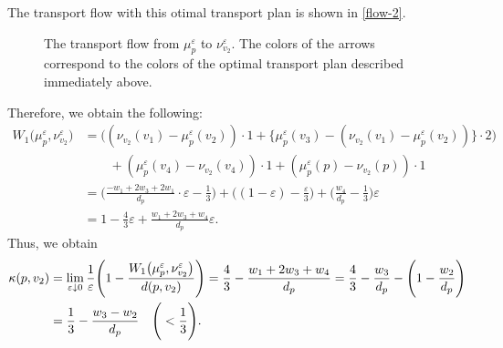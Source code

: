 \documentclass{article}
\numberwithin{equation}{section}
\theoremstyle{definition}
\newcommand{\K}{\kappa}
\newcommand{\eps}{\varepsilon} %
\newcommand{\dto}{\downarrow}
\begin{document}
The transport flow with this otimal transport plan is shown in \autoref{flow-2}.

\begin{figure}[H]
\begin{center}
\caption{The transport flow from $\mu_p^\eps$ to $\nu_{v_2}^\eps$.
The colors of the arrows correspond to the colors of the optimal transport plan described immediately above.} \label{flow-2}
\end{center}
\end{figure}

Therefore, we obtain the following:
\begin{align*}
    W_1\big(\mu_p^\eps,\nu_{v_2}^\eps\big) &= 
     \bigg( \left(\nu_{v_2}(v_1)-\mu_{p}^\eps(v_2)\right)\cdot1 + \Big\{\mu_{p}^\eps(v_3)-\left(\nu_{v_2}(v_1)-\mu_{p}^\eps(v_2)\right)\Big\}\cdot2 \bigg) \\
    &\qquad + \left(\mu_{p}^\eps(v_4)-\nu_{v_2}(v_4)\right)\cdot1 + \left(\mu_{p}^\eps(p)-\nu_{v_2}(p)\right)\cdot1 \\
    &= \Bigg(\frac{-w_1+2w_3+2w_1}{d_p}\cdot\eps-\frac{1}{3}\Bigg) 
       + \Bigg( (1-\eps)-\frac{\eps}{3} \Bigg) + \Bigg( \frac{w_4}{d_p}-\frac{1}{3} \Bigg)\eps \\
    &= 1 - \frac{4}{3}\eps + \frac{w_1+2w_3+w_4}{d_p}\eps.
\end{align*}
Thus, we obtain 
\begin{align}
    \K(p,v_2) &= 
     \lim_{\eps\dto0}\frac{1}{\eps}\Bigg(1-\frac{W_1\big(\mu_p^\eps,\nu_{v_2}^\eps\big)}{d(p,v_2)}\Bigg) 
    = \frac{4}{3} - \frac{w_1+2w_3+w_4}{d_p}
    =\frac{4}{3} - \frac{w_3}{d_p} - \Bigg( 1-\frac{w_2}{d_p} \Bigg) \notag \\ 
    &= \frac{1}{3} - \frac{w_3-w_2}{d_p} \quad \Bigg(<\frac{1}{3}\Bigg). \label{weighted-curv-p2}
\end{align}
\end{document}
